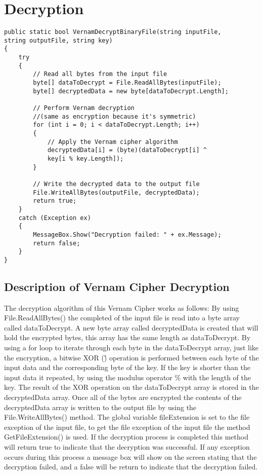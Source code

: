 \documentclass[a4paper,oneside,11pt]{book}
\begin{document}
\section{Decryption}
\begin{lstlisting}[language=Csh, caption={Code for Vernam Cipher Decryption}]
public static bool VernamDecryptBinaryFile(string inputFile, 
string outputFile, string key)
{
    try
    {
        // Read all bytes from the input file
        byte[] dataToDecrypt = File.ReadAllBytes(inputFile);
        byte[] decryptedData = new byte[dataToDecrypt.Length];
    
        // Perform Vernam decryption
        //(same as encryption because it's symmetric)
        for (int i = 0; i < dataToDecrypt.Length; i++)
        {
            // Apply the Vernam cipher algorithm
            decryptedData[i] = (byte)(dataToDecrypt[i] ^ 
            key[i % key.Length]);
        }
    
        // Write the decrypted data to the output file
        File.WriteAllBytes(outputFile, decryptedData);
        return true;
    }
    catch (Exception ex)
    {
        MessageBox.Show("Decryption failed: " + ex.Message);
        return false;
    }
}
\end{lstlisting}

\subsection{Description of Vernam Cipher Decryption}

The decryption algorithm of this Vernam Cipher works as follows:
By using File.ReadAllBytes() the completed of the input file is read into a byte array called dataToDecrypt. A new byte array called decryptedData is created that will hold the encrypted bytes, this array has the same length as dataToDecrypt. By using a for loop to iterate through each byte in the dataToDecrypt array, just like the encryption, a bitwise XOR (\^) operation is performed between each byte of the input data and the corresponding byte of the key. If the key is shorter than the input data it repeated, by using the modulus operator \% with the length of the key. The result of the XOR operation on the  dataToDecrypt array is stored in the decryptedData array. Once all of the bytes are encrypted the contents of the decryptedData array is written to the output file by using the File.WriteAllBytes() method. The global variable fileExtension is set to the file exception of the input file, to get the file exception of the input file the method GetFileExtension() is used. If the decryption process is completed this method will return true to indicate that the decryption was successful. If any exception occurs during this process a message box will show on the screen stating that the decryption failed, and a false will be return to indicate that the decryption failed.
\end{document}
